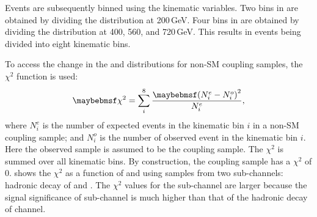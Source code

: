 Events are subsequently binned using the kinematic variables. Two bins in \HT are obtained by dividing the \HT distribution at 200\,GeV. Four bins in \mhh are obtained by dividing the \mhh distribution at 400, 560, and 720\,GeV. This results in events being divided into eight kinematic bins.


To access the change in the \mhh and \HT distributions for  non-SM coupling samples, the $\chi^2$ function is used:
\begin{equation}
\chi^2 = \sum_{i}^{8}\frac{\parenths{N_i^e - N_{i}^{o}}^2}{N_{i}^e},
\label{eqn:doubleHiggsChi2}
\end{equation}
where $N_i^e$ is the number of expected  events in the kinematic bin $i$ in a non-SM coupling sample; and $ N_{i}^{o}$ is the number of observed  event in the kinematic bin $i$. Here the observed sample is assumed to be the \SM coupling sample. The  $\chi^2$  is summed over all kinematic bins. By construction, the \SM coupling sample has a $\chi^2$ of 0.  shows the $\chi^2$  as a function of \gHHH and \gWWHH using samples from two sub-channels: hadronic \WW decay of \eeToHHbbWW and \eeToHHbbbb. The $\chi^2$ values for the \eeToHHbbbb sub-channel are larger because the signal significance of \eeToHHbbbb  sub-channel is much higher than that of the hadronic \WW decay of \eeToHHbbWW channel.



